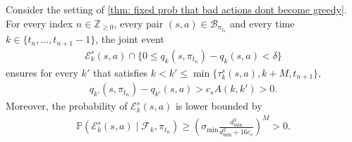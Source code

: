 \begin{lemma}
\label{thm: event to reach a_k margin}
Consider the setting of \autoref{thm: fixed prob that bad actions dont become greedy}.
For every index $n \in \mathbb Z_{\ge 0}$,
every pair $(s,a) \in \mathcal B_{\pi_{t_n}}$
and every time $k \in \{t_n, \dots, t_{n+1}-1\}$,
the joint event
\begin{align}
\label{eq: joint seed event}
\mathcal E^s_k(s,a)
\cap
\big\{0 \leq q_{k}(s,\pi_{t_n}) - q_{k}(s,a) < \delta \big\}
\end{align}
ensures
for every $k'$ that satisfies $k < k' \le \min\{ \tau^s_k(s,a), k+M, t_{n+1} \}$,
\begin{align}
\label{eq: lower bound during good prefix}
    q_{k'}(s,\pi_{t_n}) - q_{k'}(s,a)
    > c_s A(k,k') > 0 .
\end{align}
Moreover, the probability of $\mathcal E^s_k(s,a)$ is lower bounded by
\begin{align}
\label{eq: probability reach a_k margin}
    \mathbb P ( \mathcal E^s_k(s,a) \mid \mathcal F_k, \pi_{t_n} ) \ge \left( \sigma_{\min} \frac{d_{\min}^2}{d_{\min}^2 + 16 c_v} \right)^M > 0 .
\end{align}
\end{lemma}

